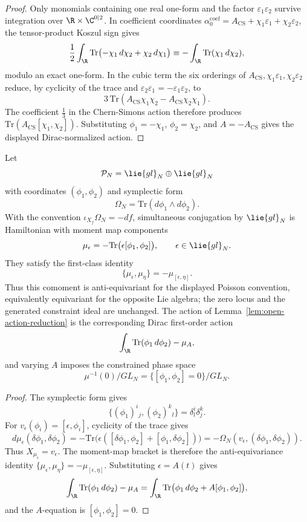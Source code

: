 \documentclass[11pt]{memoir}
\begin{document}
\begin{proof}
  Only monomials containing one real one-form and the factor
  $\varepsilon_1\varepsilon_2$ survive integration over
  $\R\times\C^{0|2}$.  In coefficient coordinates
  \(\alpha_0^{\mathrm{coef}}
    =A_{\mathrm{CS}}+\chi_1\varepsilon_1+\chi_2\varepsilon_2\), the
  tensor-product Koszul sign gives
  $$\frac12\int_\R\mathrm{Tr}\bigl(-\chi_1\,d\chi_2
      +\chi_2\,d\chi_1\bigr)
    \equiv -\int_\R\mathrm{Tr}(\chi_1\,d\chi_2),$$
  modulo an exact one-form.  In the cubic term the six orderings of
  $A_{\mathrm{CS}},\chi_1\varepsilon_1,\chi_2\varepsilon_2$ reduce, by
  cyclicity of the trace and
  $\varepsilon_2\varepsilon_1=-\varepsilon_1\varepsilon_2$, to
  $$3\,\mathrm{Tr}(A_{\mathrm{CS}}\chi_1\chi_2
      -A_{\mathrm{CS}}\chi_2\chi_1).$$
  The coefficient $\tfrac13$ in the Chern-Simons action therefore produces
  $\mathrm{Tr}(A_{\mathrm{CS}}[\chi_1,\chi_2])$.  Substituting
  \(\phi_1=-\chi_1\), \(\phi_2=\chi_2\), and
  \(A=-A_{\mathrm{CS}}\) gives the displayed Dirac-normalized action.
\end{proof}

\begin{lem}\label{lem:dirac-brane-reduction}
  Let
  $$\mathcal P_N=\lie{gl}_N\oplus\lie{gl}_N$$
  with coordinates $(\phi_1,\phi_2)$ and symplectic form
  $$\Omega_N=\mathrm{Tr}(d\phi_1\wedge d\phi_2).$$
  With the convention $\iota_{X_f}\Omega_N=-df$, simultaneous conjugation by
  $\lie{gl}_N$ is Hamiltonian with moment map components
  $$\mu_\epsilon=-\mathrm{Tr}\bigl(\epsilon[\phi_1,\phi_2]\bigr),
    \qquad \epsilon\in\lie{gl}_N.$$
  They satisfy the first-class identity
  $$\{\mu_\epsilon,\mu_\eta\}=-\mu_{[\epsilon,\eta]}.$$
  Thus this comoment is anti-equivariant for the displayed Poisson
  convention, equivalently equivariant for the opposite Lie algebra; the
  zero locus and the generated constraint ideal are unchanged.
  The action of Lemma~\ref{lem:open-action-reduction} is the corresponding
  Dirac first-order action
  $$\int_\R \mathrm{Tr}(\phi_1\,d\phi_2)-\mu_A,$$
  and varying $A$ imposes the constrained phase space
  $$\mu^{-1}(0)/GL_N=\{[\phi_1,\phi_2]=0\}/GL_N.$$
\end{lem}

\begin{proof}
  The symplectic form gives
  $$\{(\phi_1)^i{}_j,(\phi_2)^k{}_l\}=\delta^i_l\delta^k_j.$$
  For $v_\epsilon(\phi_i)=[\epsilon,\phi_i]$, cyclicity of the trace gives
  $$d\mu_\epsilon(\delta\phi_1,\delta\phi_2)
    =-\mathrm{Tr}\bigl(\epsilon([\delta\phi_1,\phi_2]
      +[\phi_1,\delta\phi_2])\bigr)
    =-\Omega_N(v_\epsilon,(\delta\phi_1,\delta\phi_2)).$$
  Thus $X_{\mu_\epsilon}=v_\epsilon$. The moment-map bracket is therefore the
  anti-equivariance identity
  $\{\mu_\epsilon,\mu_\eta\}=-\mu_{[\epsilon,\eta]}$. Substituting
  $\epsilon=A(t)$ gives
  $$\int_\R\mathrm{Tr}(\phi_1\,d\phi_2)-\mu_A
    =\int_\R\mathrm{Tr}\bigl(\phi_1\,d\phi_2+A[\phi_1,\phi_2]\bigr),$$
  and the $A$-equation is $[\phi_1,\phi_2]=0$.
\end{proof}
\end{document}
